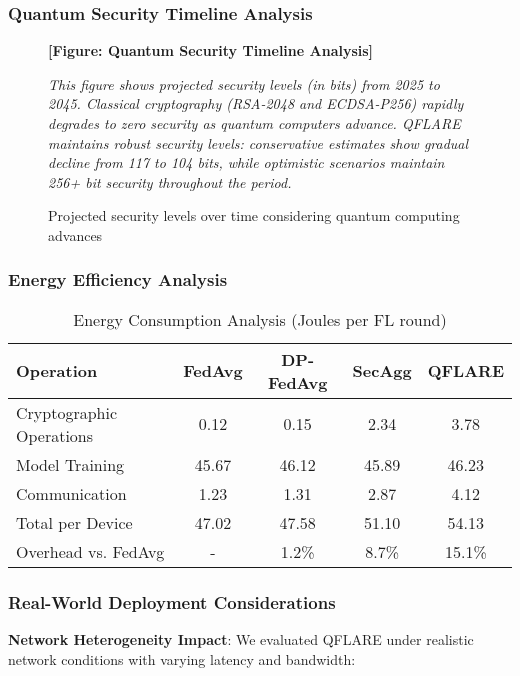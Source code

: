 \documentclass[onecolumn,11pt]{article}
\begin{document}
\subsubsection{Quantum Security Timeline Analysis}

\begin{figure}[htbp]
\centering
\textbf{[Figure: Quantum Security Timeline Analysis]}

\textit{This figure shows projected security levels (in bits) from 2025 to 2045. Classical cryptography (RSA-2048 and ECDSA-P256) rapidly degrades to zero security as quantum computers advance. QFLARE maintains robust security levels: conservative estimates show gradual decline from 117 to 104 bits, while optimistic scenarios maintain 256+ bit security throughout the period.}
\caption{Projected security levels over time considering quantum computing advances}
\end{figure}

\subsubsection{Energy Efficiency Analysis}

\begin{table}[htbp]
\centering
\caption{Energy Consumption Analysis (Joules per FL round)}
\begin{tabular}{|l|c|c|c|c|}
\hline
\textbf{Operation} & \textbf{FedAvg} & \textbf{DP-FedAvg} & \textbf{SecAgg} & \textbf{QFLARE} \\
\hline
Cryptographic Operations & 0.12 & 0.15 & 2.34 & 3.78 \\
Model Training & 45.67 & 46.12 & 45.89 & 46.23 \\
Communication & 1.23 & 1.31 & 2.87 & 4.12 \\
Total per Device & 47.02 & 47.58 & 51.10 & 54.13 \\
Overhead vs. FedAvg & - & 1.2\% & 8.7\% & 15.1\% \\
\hline
\end{tabular}
\end{table}

\subsubsection{Real-World Deployment Considerations}

\textbf{Network Heterogeneity Impact}:
We evaluated QFLARE under realistic network conditions with varying latency and bandwidth:
\end{document}
